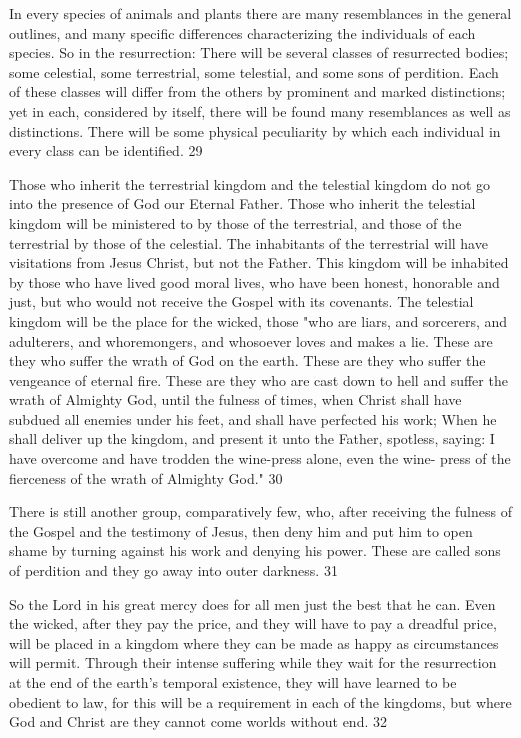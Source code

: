 In every species of animals and plants there are many resemblances in the general outlines,
and many specific differences characterizing the individuals of each species. So in the
resurrection: There will be several classes of resurrected bodies; some celestial, some
terrestrial, some telestial, and some sons of perdition. Each of these classes will differ from
the others by prominent and marked distinctions; yet in each, considered by itself, there will
be found many resemblances as well as distinctions. There will be some physical peculiarity
by which each individual in every class can be identified. 29

Those who inherit the terrestrial kingdom and the telestial kingdom do not go into the
presence of God our Eternal Father. Those who inherit the telestial kingdom will be
ministered to by those of the terrestrial, and those of the terrestrial by those of the celestial.
The inhabitants of the terrestrial will have visitations from Jesus Christ, but not the Father.
This kingdom will be inhabited by those who have lived good moral lives, who have been
honest, honorable and just, but who would not receive the Gospel with its covenants. The
telestial kingdom will be the place for the wicked, those "who are liars, and sorcerers, and
adulterers, and whoremongers, and whosoever loves and makes a lie. These are they who
suffer the wrath of God on the earth. These are they who suffer the vengeance of eternal fire.
These are they who are cast down to hell and suffer the wrath of Almighty God, until the
fulness of times, when Christ shall have subdued all enemies under his feet, and shall have
perfected his work; When he shall deliver up the kingdom, and present it unto the Father,
spotless, saying: I have overcome and have trodden the wine-press alone, even the wine-
press of the fierceness of the wrath of Almighty God." 30

There is still another group, comparatively few, who, after receiving the fulness of the
Gospel and the testimony of Jesus, then deny him and put him to open shame by turning
against his work and denying his power. These are called sons of perdition and they go away
into outer darkness. 31

So the Lord in his great mercy does for all men just the best that he can. Even the wicked,
after they pay the price, and they will have to pay a dreadful price, will be placed in a
kingdom where they can be made as happy as circumstances will permit. Through their
intense suffering while they wait for the resurrection at the end of the earth's temporal
existence, they will have learned to be obedient to law, for this will be a requirement in each
of the kingdoms, but where God and Christ are they cannot come worlds without end. 32

